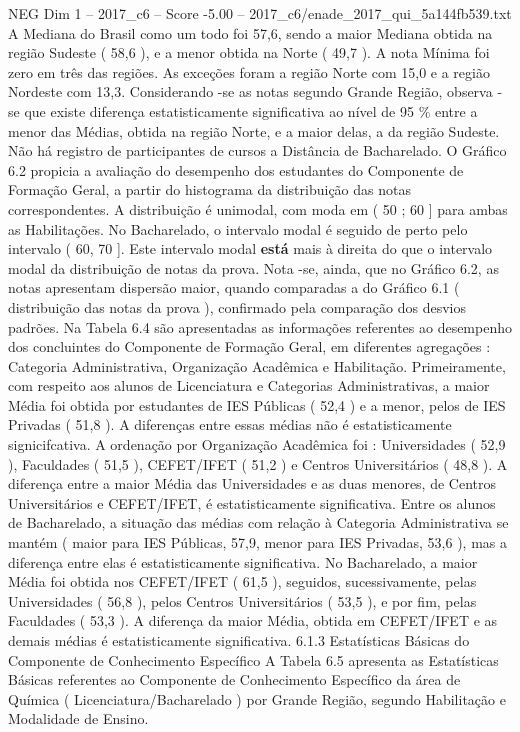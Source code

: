 \begin{textsample}{NEG Dim 1 – 2017\_c6 – Score -5.00 – 2017\_c6/enade\_2017\_qui\_5a144fb539.txt}
A Mediana do Brasil como um todo foi 57,6, sendo a maior Mediana obtida na região Sudeste ( 58,6 ), e a menor obtida na Norte ( 49,7 ).
A nota Mínima foi zero em três das regiões.
As exceções foram a região Norte com 15,0 e a região Nordeste com 13,3.
Considerando -se as notas segundo Grande Região, observa -se que existe diferença estatisticamente significativa ao nível de 95 \% entre a menor das Médias, obtida na região Norte, e a maior delas, a da região Sudeste.
Não há registro de participantes de cursos a Distância de Bacharelado.
O Gráfico 6.2 propicia a avaliação do desempenho dos estudantes do Componente de Formação Geral, a partir do histograma da distribuição das notas correspondentes.
A distribuição é unimodal, com moda em ( 50 ; 60 ] para ambas as Habilitações.
No Bacharelado, o intervalo modal é seguido de perto pelo intervalo ( 60, 70 ].
Este intervalo modal \textbf{está} mais à direita do que o intervalo modal da distribuição de notas da prova.
Nota -se, ainda, que no Gráfico 6.2, as notas apresentam dispersão maior, quando comparadas a do Gráfico 6.1 ( distribuição das notas da prova ), confirmado pela comparação dos desvios padrões.
Na Tabela 6.4 são apresentadas as informações referentes ao desempenho dos concluintes do Componente de Formação Geral, em diferentes agregações : Categoria Administrativa, Organização Acadêmica e Habilitação.
Primeiramente, com respeito aos alunos de Licenciatura e Categorias Administrativas, a maior Média foi obtida por estudantes de IES Públicas ( 52,4 ) e a menor, pelos de IES Privadas ( 51,8 ).
A diferenças entre essas médias não é estatisticamente signicifcativa.
A ordenação por Organização Acadêmica foi : Universidades ( 52,9 ), Faculdades ( 51,5 ), CEFET/IFET ( 51,2 ) e Centros Universitários ( 48,8 ).
A diferença entre a maior Média das Universidades e as duas menores, de Centros Universitários e CEFET/IFET, é estatisticamente significativa.
Entre os alunos de Bacharelado, a situação das médias com relação à Categoria Administrativa se mantém ( maior para IES Públicas, 57,9, menor para IES Privadas, 53,6 ), mas a diferença entre elas é estatisticamente significativa.
No Bacharelado, a maior Média foi obtida nos CEFET/IFET ( 61,5 ), seguidos, sucessivamente, pelas Universidades ( 56,8 ), pelos Centros Universitários ( 53,5 ), e por fim, pelas Faculdades ( 53,3 ).
A diferença da maior Média, obtida em CEFET/IFET e as demais médias é estatisticamente significativa. 6.1.3 Estatísticas Básicas do Componente de Conhecimento Específico A Tabela 6.5 apresenta as Estatísticas Básicas referentes ao Componente de Conhecimento Específico da área de Química ( Licenciatura/Bacharelado ) por Grande Região, segundo Habilitação e Modalidade de Ensino.

\end{textsample}
